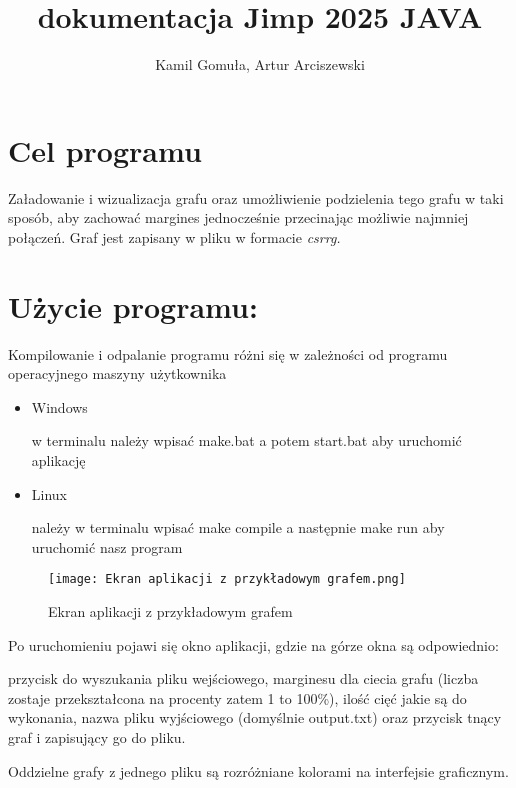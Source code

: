 \documentclass{article}
\title{dokumentacja Jimp 2025 JAVA}
\author{Kamil Gomuła, Artur Arciszewski}
\begin{document}
\maketitle



\section{Cel programu }

Załadowanie i wizualizacja grafu oraz umożliwienie podzielenia tego grafu w taki sposób, aby zachować margines jednocześnie przecinając możliwie najmniej połączeń. Graf jest zapisany w pliku w formacie \textit{csrrg.}

\section{Użycie programu: }

Kompilowanie i odpalanie programu różni się w zależności od programu operacyjnego maszyny użytkownika
\begin{itemize}
    \item Windows

w terminalu należy wpisać make.bat a potem start.bat aby uruchomić aplikację
\end{itemize}

\begin{itemize}
    \item  Linux

    należy w terminalu wpisać make compile a następnie make run aby uruchomić nasz program
\end{itemize}

\begin{figure}
    \centering
    \texttt{[image: Ekran aplikacji z przykładowym grafem.png]}
    \caption{Ekran aplikacji z przykładowym grafem}
    \label{fig:enter-label}
\end{figure}


Po uruchomieniu pojawi się okno aplikacji, gdzie na górze okna są odpowiednio:

przycisk do wyszukania pliku wejściowego, marginesu dla ciecia grafu (liczba zostaje przekształcona na procenty zatem 1 to 100\%), ilość cięć jakie są do wykonania, nazwa pliku wyjściowego (domyślnie output.txt) oraz przycisk tnący graf i zapisujący go do pliku.

Oddzielne grafy z jednego pliku są rozróżniane kolorami na interfejsie graficznym.
\end{document}
